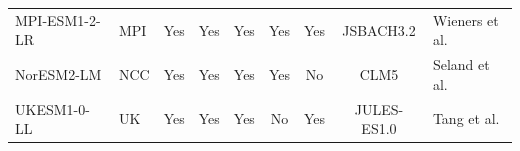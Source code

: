 \documentclass[9pt,twoside,lineno]{pnas-new_SI}
\begin{document}
\begin{table}[ht]
\begin{tabular}{llccccccl}
MPI-ESM1-2-LR                                                          & MPI                                                                  & Yes                              & Yes                              & Yes                                                      & Yes                                                      & Yes                                                                                        & JSBACH3.2                & Wieners et al. \cite{MPI}                                            \\
NorESM2-LM                                                             & NCC                                                                  & Yes                              & Yes                              & Yes                                                      & Yes                                                      & No                                                                                         & CLM5              &Seland et al. \cite{NorESM2}\\
UKESM1-0-LL                                                            & UK                                                                   & Yes                              & Yes                              & Yes                                                      & No                                                       & Yes                                                                                        & JULES-ES1.0             & Tang et al. \cite{UKESM}                                             \\ \hline
\end{tabular}
\end{table}
\end{document}
